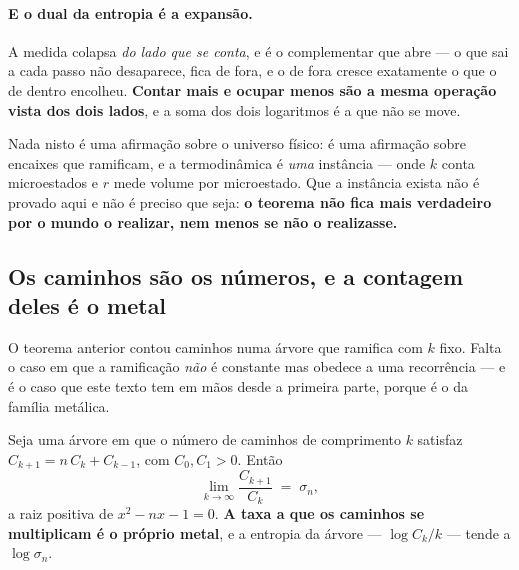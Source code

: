 \documentclass[livro.tex]{subfiles}
\begin{document}

\paragraph{E o dual da entropia é a expansão.} A medida colapsa \emph{do lado que se conta}, e é o
complementar que abre --- o que sai a cada passo não desaparece, fica de fora, e o de fora cresce
exatamente o que o de dentro encolheu. \textbf{Contar mais e ocupar menos são a mesma operação
vista dos dois lados}, e a soma dos dois logaritmos é a que não se move.

\medskip
\noindent Nada nisto é uma afirmação sobre o universo físico:
é uma afirmação sobre encaixes que ramificam, e a termodinâmica é \emph{uma} instância --- onde
$k$ conta microestados e $r$ mede volume por microestado. Que a instância exista não é provado
aqui e não é preciso que seja: \textbf{o teorema não fica mais verdadeiro por o mundo o realizar,
nem menos se não o realizasse.}



\subsection{Os caminhos são os números, e a contagem deles é o metal}\label{sec:caminhos}

\noindent O teorema anterior contou caminhos numa árvore que ramifica com $k$ fixo. Falta o caso
em que a ramificação \emph{não} é constante mas obedece a uma recorrência --- e é o caso que este
texto tem em mãos desde a primeira parte, porque é o da família metálica.

\begin{teorema}\label{thm:caminhosmetal}
Seja uma árvore em que o número de caminhos de comprimento $k$ satisfaz
$C_{k+1}=n\,C_k+C_{k-1}$, com $C_0,C_1>0$. Então
\[
  \lim_{k\to\infty}\frac{C_{k+1}}{C_k} \;=\; \sigma_n ,
\]
a raiz positiva de $x^{2}-nx-1=0$. \textbf{A taxa a que os caminhos se multiplicam é o próprio
metal}, e a entropia da árvore --- $\log C_k / k$ --- tende a $\log\sigma_n$.
\end{teorema}
\end{document}
